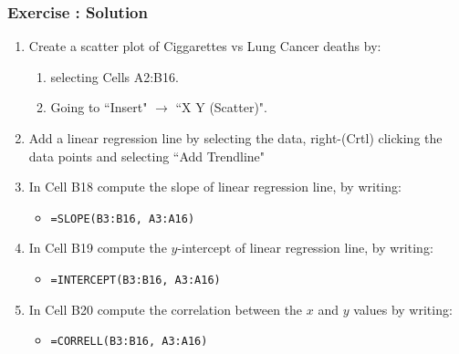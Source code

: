 \documentclass[12pt]{beamer}
\begin{document}
	\begin{frame}
		\frametitle{Exercise : Solution}
			\begin{enumerate}
				\item Create a scatter plot of Ciggarettes vs Lung Cancer deaths by:
				\begin{enumerate}
					\item selecting Cells A2:B16. 
					\item Going to ``Insert" $\rightarrow$ ``X Y (Scatter)".
				\end{enumerate}
				\item Add a linear regression line by selecting the data, right-(Crtl) clicking the data points and selecting ``Add Trendline"
				\item In Cell B18 compute the slope of linear regression line, by writing:
				\begin{itemize}
					\item \texttt{=SLOPE(B3:B16, A3:A16)}
				\end{itemize}
				\item In Cell B19 compute the $y$-intercept of linear regression line, by writing:
				\begin{itemize}
					\item \texttt{=INTERCEPT(B3:B16, A3:A16)}
				\end{itemize}
				\item In Cell B20 compute the correlation between the $x$ and $y$ values by writing:
				\begin{itemize}
					\item \texttt{=CORRELL(B3:B16, A3:A16)}
				\end{itemize}
			\end{enumerate}
	\end{frame}
\end{document}
